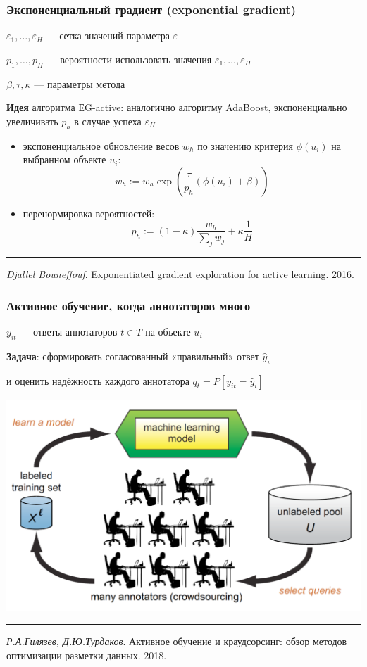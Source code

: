 \documentclass[fullscreen=true, bookmarks=true, hyperref={pdfencoding=unicode}]{beamer}
\begin{document}
\begin{frame}
  \frametitle{Экспоненциальный градиент (exponential gradient)}

  $\varepsilon_1, \dots, \varepsilon_H$ — сетка значений параметра $\varepsilon$

  $p_1,\dots,p_H$ — вероятности использовать значения $\varepsilon_1, \dots, \varepsilon_H$

  $\beta, \tau, \kappa$ — параметры метода

  {\bf Идея} алгоритма ЕG-active: аналогично алгоритму AdaBoost, экспоненциально увеличивать $p_h$ в случае успеха $\varepsilon_H$

  \begin{itemize}
    \item экспоненциальное обновление весов $w_h$ по значению критерия $\phi(u_i)$ на выбранном объекте $u_i$:
    $$ w_h := w_h \exp \left(\frac{\tau}{p_h}(\phi(u_i) + \beta) \right) $$
    \item перенормировка вероятностей:
    $$ p_h := (1-\kappa) \frac{w_h}{\sum_j w_j} + \kappa \frac{1}{H} $$
  \end{itemize}

  \noindent\rule{8cm}{0.4pt}

  {\small
  {\it Djallel Bouneffouf}. Exponentiated gradient exploration for active learning. 2016.}

\end{frame}


\begin{frame}
  \frametitle{Активное обучение, когда аннотаторов много}

  $y_{it}$ — ответы аннотаторов $t \in T$ на объекте $u_i$

  {\bf Задача}: сформировать согласованный «правильный» ответ $\hat y_i$

  и оценить надёжность каждого аннотатора $q_t = P[y_{it} = \hat y_i]$

  \begin{center}
    \includegraphics[keepaspectratio,
                     width=.65\paperwidth]{AL_crowd.png}
  \end{center}

  \noindent\rule{8cm}{0.4pt}

  {\small
  {\it Р.А.Гилязев‚ Д.Ю.Турдаков}. Активное обучение и краудсорсинг: обзор
  методов оптимизации разметки данных. 2018.}

\end{frame}
\end{document}
